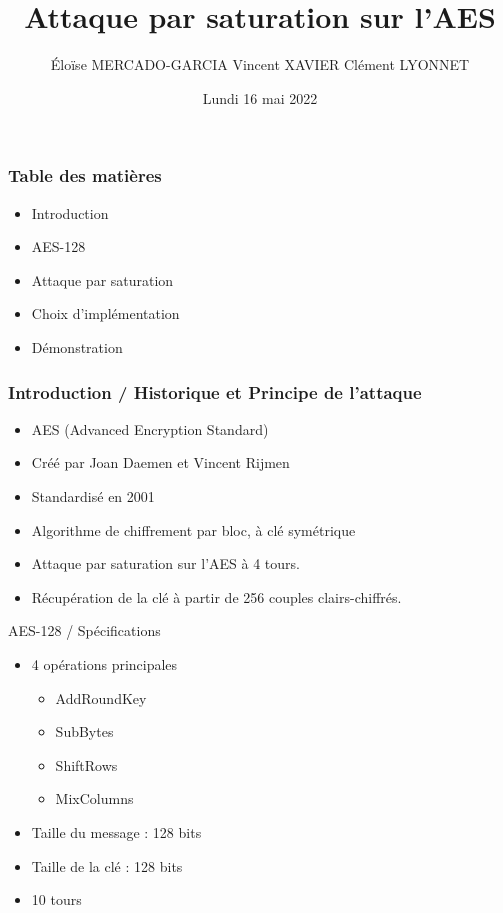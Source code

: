 \documentclass{beamer}
\date{Lundi 16 mai 2022}
\title{Attaque par saturation sur l'AES}
\author{Éloïse MERCADO-GARCIA \newline Vincent XAVIER \newline Clément LYONNET}
\begin{document}
	
	\begin{frame}
		[plain] \titlepage
	\end{frame}

	\begin{frame}
		\frametitle{Table des matières}
		\begin{itemize}
			\item Introduction
			\item AES-128
			\item Attaque par saturation
			\item Choix d'implémentation
			\item Démonstration
		\end{itemize}
	\end{frame}

	\begin{frame}
	    \frametitle{Introduction / Historique et Principe de l'attaque}
	    \begin{itemize}
	    	\item AES (Advanced Encryption Standard)
	        \item Créé par Joan Daemen et Vincent Rijmen
	        \item Standardisé en 2001
	        \item Algorithme de chiffrement par bloc, à clé symétrique
	        \vspace{0.5 cm}
	        \item Attaque par saturation sur l'AES à 4 tours.
	        \item Récupération de la clé à partir de 256 couples clairs-chiffrés.
	    \end{itemize}
	\end{frame}

\begin{frame}{AES-128 / Spécifications}
\begin{itemize}
    \item 4 opérations principales
    \begin{itemize}
        \item AddRoundKey
    \item SubBytes
    \item ShiftRows
    \item MixColumns
    \end{itemize}
    \item Taille du message : 128 bits
    \item Taille de la clé : 128 bits
    \item 10 tours
\end{itemize}
\end{frame}
\end{document}
